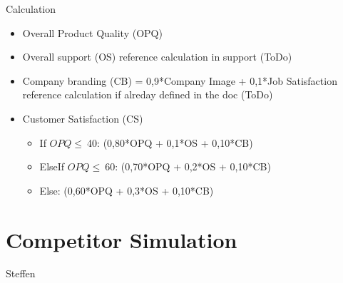 \documentclass[11pt,titlepage,oneside,openany]{book}
\begin{document}
Calculation
\begin{itemize}
    \item Overall Product Quality (OPQ)
    \item Overall support (OS) reference calculation in support (ToDo)
    \item Company branding (CB) = 0,9*Company Image + 0,1*Job Satisfaction reference calculation if alreday defined in the doc (ToDo)
    \item Customer Satisfaction (CS)
    \begin{itemize}
    \item If $OPQ \leq \ $40: (0,80*OPQ + 0,1*OS + 0,10*CB)
    \item ElseIf $OPQ \leq \ $60: (0,70*OPQ + 0,2*OS + 0,10*CB)
    \item Else: (0,60*OPQ + 0,3*OS + 0,10*CB)
    \end{itemize}
\end{itemize}

\section{Competitor Simulation}
Steffen
\end{document}
